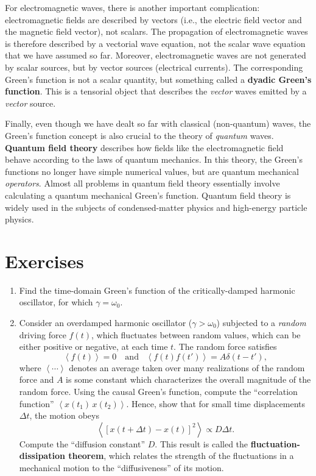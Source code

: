 \documentclass[10pt,a4paper]{article}
\begin{document}
For electromagnetic waves, there is another important complication:
electromagnetic fields are described by vectors (i.e., the electric
field vector and the magnetic field vector), not scalars.  The
propagation of electromagnetic waves is therefore described by a
vectorial wave equation, not the scalar wave equation that we have
assumed so far. Moreover, electromagnetic waves are not generated by
scalar sources, but by vector sources (electrical currents). The
corresponding Green's function is not a scalar quantity, but something
called a \textbf{dyadic Green's function}. This is a tensorial object
that describes the \emph{vector} waves emitted by a \emph{vector}
source.

Finally, even though we have dealt so far with classical (non-quantum)
waves, the Green's function concept is also crucial to the theory of
\emph{quantum} waves. \textbf{Quantum field theory} describes how
fields like the electromagnetic field behave according to the laws of
quantum mechanics. In this theory, the Green's functions no longer
have simple numerical values, but are quantum mechanical
\emph{operators}. Almost all problems in quantum field theory
essentially involve calculating a quantum mechanical Green's
function. Quantum field theory is widely used in the subjects of
condensed-matter physics and high-energy particle physics.

\section{Exercises}\label{exercises}

\begin{enumerate}
\item 
Find the time-domain Green's function of the critically-damped harmonic
oscillator, for which $\gamma = \omega_0$.

\item
Consider an overdamped harmonic oscillator ($\gamma > \omega_0$)
subjected to a \emph{random} driving force $f(t)$, which fluctuates
between random values, which can be either positive or negative, at each
time $t$. The random force satisfies
\begin{equation}
\left\langle f(t)\right\rangle = 0 \quad\mathrm{and}\;\;\;\left\langle f(t) f(t')\right\rangle = A \delta(t-t'),
\end{equation}
where $\left\langle\cdots\right\rangle$ denotes an average taken over
many realizations of the random force and $A$ is some constant which
characterizes the overall magnitude of the random force. Using the
causal Green's function, compute the ``correlation function''
$\left\langle x(t_1)\, x(t_2) \right\rangle$. Hence, show that for
small time displacements $\Delta t$, the motion obeys
\begin{equation}
\left\langle [x(t+\Delta t) - x(t)]^2 \right\rangle \propto D \Delta t.
\end{equation}
Compute the ``diffusion constant'' $D$. This result is called the
\textbf{fluctuation-dissipation theorem}, which relates the strength of
the fluctuations in a mechanical motion to the ``diffusiveness'' of its
motion.
\end{enumerate}
\end{document}
